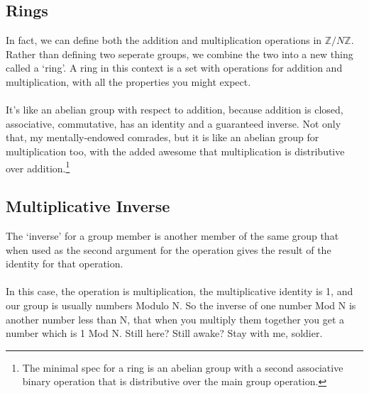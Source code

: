     \subsection{Rings}
    In fact, we can define both the addition and multiplication operations in $\mathbb{Z}/N\mathbb{Z}$. Rather than defining two seperate groups, we combine the two into a new thing called a `ring'. A ring in this context is a set with operations for addition and multiplication, with all the properties you might expect.\\
    \\
    It's like an abelian group with respect to addition, because addition is closed, associative, commutative, has an identity and a guaranteed inverse. Not only that, my mentally-endowed comrades, but it is like an abelian group for multiplication too, with the added awesome that multiplication is distributive over addition.\footnote{The minimal spec for a ring is an abelian group with a second associative binary operation that is distributive over the main group operation.}

    \subsection{Multiplicative Inverse}
    The `inverse' for a group member is another member of the same group that when used as the second argument for the operation gives the result of the identity for that operation.\\
    \\
    In this case, the operation is multiplication, the multiplicative identity is 1, and our group is usually numbers Modulo N. So the inverse of one number Mod N is another number less than N, that when you multiply them together you get a number which is 1 Mod N. Still here? Still awake? Stay with me, soldier.
    
